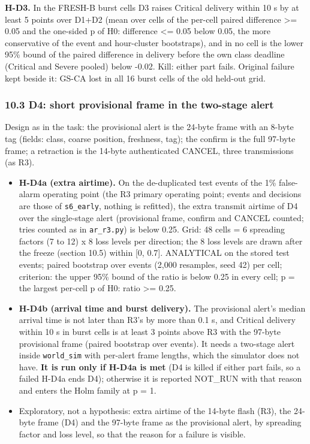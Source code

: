 \textbf{H-D3.} In the FRESH-B burst cells D3 raises Critical delivery within 10 s by at least 5 points over D1+D2 (mean over cells of the per-cell paired difference >= 0.05 and the one-sided p of H0: difference <= 0.05 below 0.05, the more conservative of the event and hour-cluster bootstraps), and in no cell is the lower 95\% bound of the paired difference in delivery before the own class deadline (Critical and Severe pooled) below -0.02. Kill: either part fails. Original failure kept beside it: GS-CA lost in all 16 burst cells of the old held-out grid.

\subsubsection*{10.3 D4: short provisional frame in the two-stage alert}
Design as in the task: the provisional alert is the 24-byte frame with an 8-byte tag (fields: class, coarse position, freshness, tag); the confirm is the full 97-byte frame; a retraction is the 14-byte authenticated CANCEL, three transmissions (as R3).
\begin{itemize}
\item \textbf{H-D4a (extra airtime).} On the de-duplicated test events of the 1\% false-alarm operating point (the R3 primary operating point; events and decisions are those of \texttt{s6\_early}, nothing is refitted), the extra transmit airtime of D4 over the single-stage alert (provisional frame, confirm and CANCEL counted; tries counted as in \texttt{ar\_r3.py}) is below 0.25. Grid: 48 cells = 6 spreading factors (7 to 12) x 8 loss levels per direction; the 8 loss levels are drawn after the freeze (section 10.5) within [0, 0.7]. ANALYTICAL on the stored test events; paired bootstrap over events (2,000 resamples, seed 42) per cell; criterion: the upper 95\% bound of the ratio is below 0.25 in every cell; p = the largest per-cell p of H0: ratio >= 0.25.
\item \textbf{H-D4b (arrival time and burst delivery).} The provisional alert's median arrival time is not later than R3's by more than 0.1 s, and Critical delivery within 10 s in burst cells is at least 3 points above R3 with the 97-byte provisional frame (paired bootstrap over events). It needs a two-stage alert inside \texttt{world\_sim} with per-alert frame lengths, which the simulator does not have. \textbf{It is run only if H-D4a is met} (D4 is killed if either part fails, so a failed H-D4a ends D4); otherwise it is reported NOT\_RUN with that reason and enters the Holm family at p = 1.
\item Exploratory, not a hypothesis: extra airtime of the 14-byte flash (R3), the 24-byte frame (D4) and the 97-byte frame as the provisional alert, by spreading factor and loss level, so that the reason for a failure is visible.
\end{itemize}


